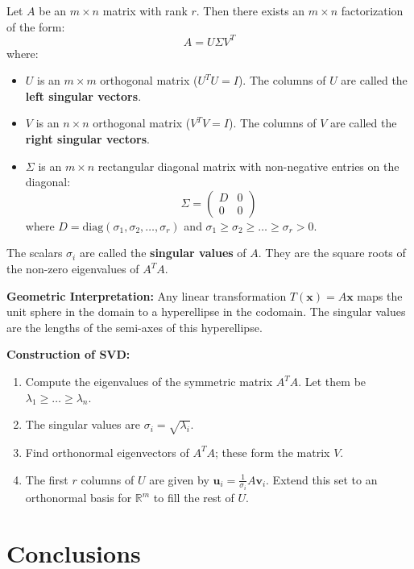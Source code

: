 \begin{theorem}
Let $A$ be an $m \times n$ matrix with rank $r$. Then there exists an $m \times n$ factorization of the form:
\[ A = U \Sigma V^T \]
where:
\begin{itemize}
    \item $U$ is an $m \times m$ orthogonal matrix ($U^T U = I$). The columns of $U$ are called the \textbf{left singular vectors}.
    \item $V$ is an $n \times n$ orthogonal matrix ($V^T V = I$). The columns of $V$ are called the \textbf{right singular vectors}.
    \item $\Sigma$ is an $m \times n$ rectangular diagonal matrix with non-negative entries on the diagonal:
    \[ \Sigma = \begin{pmatrix} D & 0 \\ 0 & 0 \end{pmatrix} \]
    where $D = \text{diag}(\sigma_1, \sigma_2, \dots, \sigma_r)$ and $\sigma_1 \ge \sigma_2 \ge \dots \ge \sigma_r > 0$.
\end{itemize}
The scalars $\sigma_i$ are called the \textbf{singular values} of $A$. They are the square roots of the non-zero eigenvalues of $A^T A$.
\end{theorem}

\textbf{Geometric Interpretation:}
Any linear transformation $T(\mathbf{x}) = A\mathbf{x}$ maps the unit sphere in the domain to a hyperellipse in the codomain. The singular values are the lengths of the semi-axes of this hyperellipse.

\textbf{Construction of SVD:}
\begin{enumerate}
    \item Compute the eigenvalues of the symmetric matrix $A^T A$. Let them be $\lambda_1 \ge \dots \ge \lambda_n$.
    \item The singular values are $\sigma_i = \sqrt{\lambda_i}$.
    \item Find orthonormal eigenvectors of $A^T A$; these form the matrix $V$.
    \item The first $r$ columns of $U$ are given by $\mathbf{u}_i = \frac{1}{\sigma_i} A \mathbf{v}_i$. Extend this set to an orthonormal basis for $\mathbb{R}^m$ to fill the rest of $U$.
\end{enumerate}

\section{Conclusions}

